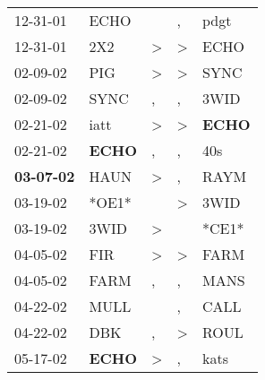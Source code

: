 \begin{supertabular}{p{0.07\textwidth}p{0.06\textwidth}p{0.02\textwidth}p{0.02\textwidth}p{0.06\textwidth}}
          12-31-01\textsuperscript{} &           ECHO\textsuperscript{} &                  &                , &           pdgt\textsuperscript{} \\
          12-31-01\textsuperscript{} &            2X2\textsuperscript{} &     \textgreater &     \textgreater &           ECHO\textsuperscript{} \\
          02-09-02\textsuperscript{} &            PIG\textsuperscript{} &     \textgreater &     \textgreater &           SYNC\textsuperscript{} \\
          02-09-02\textsuperscript{} &           SYNC\textsuperscript{} &                , &                , &           3WID\textsuperscript{} \\
          02-21-02\textsuperscript{} &           iatt\textsuperscript{} &     \textgreater &     \textgreater &  \textbf{ECHO\textsuperscript{}} \\
          02-21-02\textsuperscript{} &  \textbf{ECHO\textsuperscript{}} &                , &                , &            40s\textsuperscript{} \\
 \textbf{03-07-02\textsuperscript{}} &           HAUN\textsuperscript{} &     \textgreater &                , &           RAYM\textsuperscript{} \\
          03-19-02\textsuperscript{} &                            *OE1* &                  &     \textgreater &           3WID\textsuperscript{} \\
          03-19-02\textsuperscript{} &           3WID\textsuperscript{} &     \textgreater &                  &                            *CE1* \\
          04-05-02\textsuperscript{} &            FIR\textsuperscript{} &     \textgreater &     \textgreater &           FARM\textsuperscript{} \\
          04-05-02\textsuperscript{} &           FARM\textsuperscript{} &                , &                , &           MANS\textsuperscript{} \\
          04-22-02\textsuperscript{} &           MULL\textsuperscript{} &                  &                , &           CALL\textsuperscript{} \\
          04-22-02\textsuperscript{} &            DBK\textsuperscript{} &                , &     \textgreater &           ROUL\textsuperscript{} \\
          05-17-02\textsuperscript{} &  \textbf{ECHO\textsuperscript{}} &     \textgreater &                , &           kats\textsuperscript{} \\

\end{supertabular}
